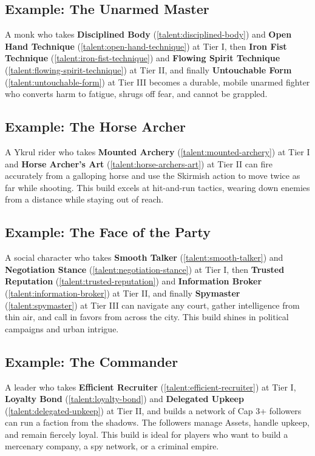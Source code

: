 {\subsection*{Example: The Unarmed Master}
\label{sec:unarmed-master-example}
A monk who takes \textbf{Disciplined Body} (\ref{talent:disciplined-body}) and \textbf{Open Hand Technique} (\ref{talent:open-hand-technique}) at Tier I, then \textbf{Iron Fist Technique} (\ref{talent:iron-fist-technique}) and \textbf{Flowing Spirit Technique} (\ref{talent:flowing-spirit-technique}) at Tier II, and finally \textbf{Untouchable Form} (\ref{talent:untouchable-form}) at Tier III becomes a durable, mobile unarmed fighter who converts harm to fatigue, shrugs off fear, and cannot be grappled.

\subsection*{Example: The Horse Archer}
\label{sec:horse-archer-example}
A Ykrul rider who takes \textbf{Mounted Archery} (\ref{talent:mounted-archery}) at Tier I and \textbf{Horse Archer's Art} (\ref{talent:horse-archers-art}) at Tier II can fire accurately from a galloping horse and use the Skirmish action to move twice as far while shooting. This build excels at hit-and-run tactics, wearing down enemies from a distance while staying out of reach.

\subsection*{Example: The Face of the Party}
\label{sec:face-example}
A social character who takes \textbf{Smooth Talker} (\ref{talent:smooth-talker}) and \textbf{Negotiation Stance} (\ref{talent:negotiation-stance}) at Tier I, then \textbf{Trusted Reputation} (\ref{talent:trusted-reputation}) and \textbf{Information Broker} (\ref{talent:information-broker}) at Tier II, and finally \textbf{Spymaster} (\ref{talent:spymaster}) at Tier III can navigate any court, gather intelligence from thin air, and call in favors from across the city. This build shines in political campaigns and urban intrigue.

\subsection*{Example: The Commander}
\label{sec:commander-example}
A leader who takes \textbf{Efficient Recruiter} (\ref{talent:efficient-recruiter}) at Tier I, \textbf{Loyalty Bond} (\ref{talent:loyalty-bond}) and \textbf{Delegated Upkeep} (\ref{talent:delegated-upkeep}) at Tier II, and builds a network of Cap 3+ followers can run a faction from the shadows. The followers manage Assets, handle upkeep, and remain fiercely loyal. This build is ideal for players who want to build a mercenary company, a spy network, or a criminal empire.

}
